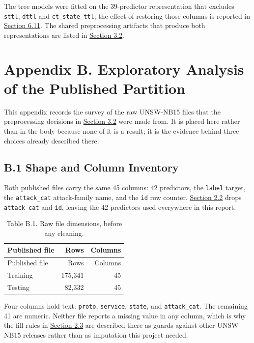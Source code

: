 \documentclass[
  canadian,
  12pt,
]{article}
\let\reportOrigSection\section
\renewcommand{\section}{\par\Needspace*{10\baselineskip}\reportOrigSection}%
\let\reportOrigSubsection\subsection
\renewcommand{\subsection}{\par\Needspace*{8\baselineskip}\reportOrigSubsection}%
\begin{document}
The tree models were fitted on the 39-predictor representation that
excludes \texttt{sttl}, \texttt{dttl} and \texttt{ct\_state\_ttl}; the
effect of restoring those columns is reported in
\hyperref[sec-6-11]{Section 6.11}. The shared preprocessing artifacts
that produce both representations are listed in
\hyperref[sec-3-2]{Section 3.2}.

\clearpage

\section{Appendix B. Exploratory Analysis of the Published
Partition}\label{sec-app-isaac}

This appendix records the survey of the raw UNSW-NB15 files that the
preprocessing decisions in \hyperref[sec-3-2]{Section 3.2} were made
from. It is placed here rather than in the body because none of it is a
result; it is the evidence behind three choices already described there.

\subsection{B.1 Shape and Column Inventory}\label{sec-app-isaac-1}

Both published files carry the same 45 columns: 42 predictors, the
\texttt{label} target, the \texttt{attack\_cat} attack-family name, and
the \texttt{id} row counter. \hyperref[sec-2-2]{Section 2.2} drops
\texttt{attack\_cat} and \texttt{id}, leaving the 42 predictors used
everywhere in this report.

\begin{longtable}[]{@{}lrr@{}}
\caption{Table B.1. Raw file dimensions, before any
cleaning.}\tabularnewline
\toprule\noalign{}
Published file & Rows & Columns \\
\midrule\noalign{}
\endfirsthead
\toprule\noalign{}
Published file & Rows & Columns \\
\midrule\noalign{}
\endhead
\bottomrule\noalign{}
\endlastfoot
Training & 175,341 & 45 \\
Testing & 82,332 & 45 \\
\end{longtable}

Four columns hold text: \texttt{proto}, \texttt{service},
\texttt{state}, and \texttt{attack\_cat}. The remaining 41 are numeric.
Neither file reports a missing value in any column, which is why the
fill rules in \hyperref[sec-2-3]{Section 2.3} are described there as
guards against other UNSW-NB15 releases rather than as imputation this
project needed.
\end{document}
